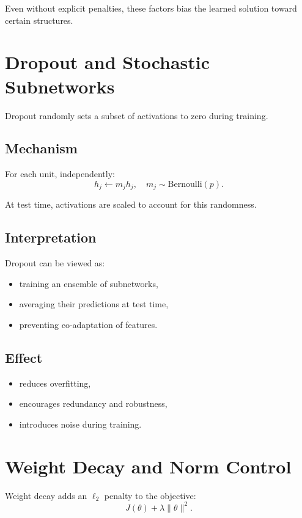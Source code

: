 Even without explicit penalties, these factors bias the learned solution toward certain structures.

\section{Dropout and Stochastic Subnetworks}

Dropout randomly sets a subset of activations to zero during training.

\subsection{Mechanism}

For each unit, independently:
\[
h_j \leftarrow m_j h_j,\quad m_j \sim \mathrm{Bernoulli}(p).
\]

At test time, activations are scaled to account for this randomness.

\subsection{Interpretation}

Dropout can be viewed as:
\begin{itemize}
    \item training an ensemble of subnetworks,
    \item averaging their predictions at test time,
    \item preventing co-adaptation of features.
\end{itemize}

\subsection{Effect}

\begin{itemize}
    \item reduces overfitting,
    \item encourages redundancy and robustness,
    \item introduces noise during training.
\end{itemize}

\section{Weight Decay and Norm Control}

Weight decay adds an $\ell_2$ penalty to the objective:
\[
J(\theta) + \lambda \|\theta\|^2.
\]

